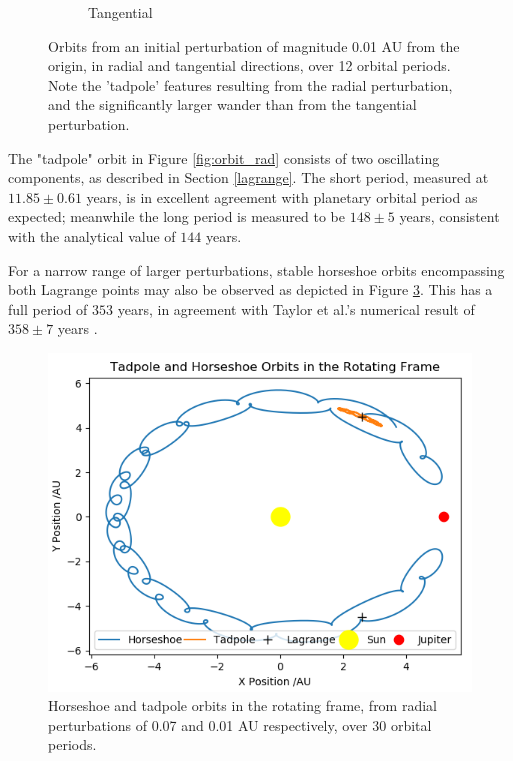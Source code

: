 \documentclass[11pt, a4paper,twocolumn]{article} %
\begin{document}
\begin{figure}[ht]
\begin{subfigure}{.23\textwidth}
		\caption{Tangential}
		\label{fig:orbit_tan}
	\end{subfigure}
	\caption{Orbits from an initial perturbation of magnitude 0.01 AU from the origin, in radial and tangential directions, over 12 orbital periods. Note the 'tadpole' features resulting from the radial perturbation, and the significantly larger wander than from the tangential perturbation.}
	\label{fig:orbitplots}
\end{figure}


 
The "tadpole" orbit in Figure \ref{fig:orbit_rad} consists of two oscillating components, as described in Section \ref{lagrange}. The short period, measured at $11.85 \pm 0.61$ years, is in excellent agreement with  planetary orbital period as expected; meanwhile the long period is measured to be $148 \pm 5$ years, consistent with the analytical value of $144$ years.

For a narrow range of larger perturbations, stable horseshoe orbits encompassing both Lagrange points may also be observed as depicted in Figure \ref{fig:horseshoe}. This has a full period of $353$ years, in agreement with Taylor et al.'s numerical result of $358 \pm 7$ years \cite{Taylor1981}.


\begin{figure}
	\centering
	\includegraphics[width=0.8\linewidth]{Figures/horseshoe}
	\caption{Horseshoe and tadpole orbits in the rotating frame, from radial perturbations of 0.07 and 0.01 AU respectively, over 30 orbital periods.}
	\label{fig:horseshoe}
\end{figure}
\end{document}
